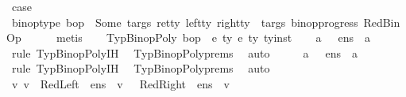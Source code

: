 \begin{isabellebody}
\ {\isacharquery}{\kern0pt}case\ \isamarkupfalse%
\ {\isacartoucheopen}binop{\isacharunderscore}{\kern0pt}type\ bop\ {\isacharequal}{\kern0pt}\ Some\ {\isacharparenleft}{\kern0pt}targs{\isacharcomma}{\kern0pt}\ ret{\isacharunderscore}{\kern0pt}ty{\isacharparenright}{\kern0pt}{\isacartoucheclose}\ {\isacartoucheopen}{\isacharparenleft}{\kern0pt}left{\isacharunderscore}{\kern0pt}ty{\isacharcomma}{\kern0pt}\ right{\isacharunderscore}{\kern0pt}ty{\isacharparenright}{\kern0pt}\ {\isasymin}\ targs{\isacartoucheclose}\ binop{\isacharunderscore}{\kern0pt}progress\ RedBinOp\isanewline
\ \ \ \ \isamarkupfalse%
\ metis\isanewline
{}\isamarkupfalse%
\isanewline
\ \ \isamarkupfalse%
\ {\isacharparenleft}{\kern0pt}TypBinopPoly\ bop\ {\isasymDelta}\ e{}\ ty{}\ e{}\ ty{}\ ty{\isacharunderscore}{\kern0pt}inst{\isacharparenright}{\kern0pt}\isanewline
\ \ \isamarkupfalse%
\ {\isachardoublequoteopen}{\isasymexists}a{\isachardot}{\kern0pt}\ {\isasymLambda}{\isacharcomma}{\kern0pt}{\isasymGamma}{\isacharcomma}{\kern0pt}{\isasymOmega}\ {\isasymturnstile}\ {\isasymlangle}e{}{\isacharcomma}{\kern0pt}n{\isacharunderscore}{\kern0pt}s{\isasymrangle}\ {\isasymDown}\ a{\isachardoublequoteclose}\ \isanewline
\ \ \ \ \isamarkupfalse%
\ {\isacharparenleft}{\kern0pt}rule\ TypBinopPoly{\isachardot}{\kern0pt}IH{\isacharparenright}{\kern0pt}\ \isamarkupfalse%
\ TypBinopPoly{\isachardot}{\kern0pt}prems\ \isamarkupfalse%
\ auto\isanewline
\ \ \isamarkupfalse%
\ \isamarkupfalse%
\ {\isachardoublequoteopen}{\isasymexists}a{\isachardot}{\kern0pt}\ {\isasymLambda}{\isacharcomma}{\kern0pt}{\isasymGamma}{\isacharcomma}{\kern0pt}{\isasymOmega}\ {\isasymturnstile}\ {\isasymlangle}e{}{\isacharcomma}{\kern0pt}n{\isacharunderscore}{\kern0pt}s{\isasymrangle}\ {\isasymDown}\ a{\isachardoublequoteclose}\isanewline
\ \ \ \ \isamarkupfalse%
\ {\isacharparenleft}{\kern0pt}rule\ TypBinopPoly{\isachardot}{\kern0pt}IH{\isacharparenright}{\kern0pt}\ \isamarkupfalse%
\ TypBinopPoly{\isachardot}{\kern0pt}prems\ \isamarkupfalse%
\ auto\isanewline
\ \ \isamarkupfalse%
\ \ \isamarkupfalse%
\ v{}\ v{}\ \ RedLeft{\isacharcolon}{\kern0pt}{\isachardoublequoteopen}{\isasymLambda}{\isacharcomma}{\kern0pt}{\isasymGamma}{\isacharcomma}{\kern0pt}{\isasymOmega}\ {\isasymturnstile}\ {\isasymlangle}e{}{\isacharcomma}{\kern0pt}n{\isacharunderscore}{\kern0pt}s{\isasymrangle}\ {\isasymDown}\ v{}{\isachardoublequoteclose}\ \ \ RedRight{\isacharcolon}{\kern0pt}{\isachardoublequoteopen}{\isasymLambda}{\isacharcomma}{\kern0pt}{\isasymGamma}{\isacharcomma}{\kern0pt}{\isasymOmega}\ {\isasymturnstile}\ {\isasymlangle}e{}{\isacharcomma}{\kern0pt}n{\isacharunderscore}{\kern0pt}s{\isasymrangle}\ {\isasymDown}\ v{}{\isachardoublequoteclose}\isanewline

\end{isabellebody}
